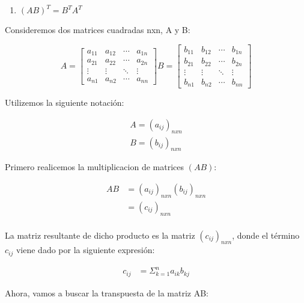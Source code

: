 
\renewcommand{\theenumi}{\alph{enumi}} %

\begin{enumerate}
    \item $ (AB)^{T} = B^{T} A^{T}  $
\end{enumerate}

Consideremos dos matrices cuadradas nxn, A y B:

\begin{equation*}
    A= \begin{bmatrix}
            a_{11} & a_{12} & \cdots & a_{1n} \\
            a_{21} & a_{22} & \cdots & a_{2n} \\
            \vdots  & \vdots  & \ddots  & \vdots  \\
            a_{n1} & a_{n2} & \cdots & a_{nn}
       \end{bmatrix}
    B= \begin{bmatrix}
        b_{11} & b_{12} & \cdots & b_{1n} \\
        b_{21} & b_{22} & \cdots & b_{2n} \\
        \vdots  & \vdots  & \ddots  & \vdots  \\
        b_{n1} & b_{n2} & \cdots & b_{nn}
   \end{bmatrix}
  \end{equation*}

Utilizemos la siguiente notación:

\begin{gather*}
    A= (a_{ij})_{nxn} \\
    B=(b_{ij})_{nxn}
\end{gather*}

Primero realicemos la multiplicacion de matrices $ \left( AB \right) $:

\begin{align*}
    AB   &= (a_{ij})_{nxn} (b_{ij})_{nxn} \\
                        &= \left( c_{ij} \right)_{nxn} \\
\end{align*}

La matriz resultante de dicho producto es la matriz $ \left( c_{ij} \right)_{nxn} $, donde
el término $c_{ij}$ viene dado por la siguiente expresión:

\begin{align*}
    c_{ij}    &= \Sigma_{k=1}^{n} a_{ik} b_{kj}
\end{align*}


Ahora, vamos a buscar la transpuesta de la matriz AB:

